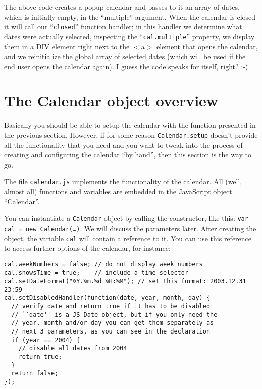 \documentclass[a4paper,twoside,10pt]{dynadoc}
\begin{document}
The above code creates a popup calendar and passes to it an array of dates,
which is initially empty, in the “multiple” argument.  When the calendar is
closed it will call our “\texttt{closed}” function handler; in this handler
we determine what dates were actually selected, inspecting the
“\texttt{cal.multiple}” property, we display them in a DIV element right
next to the $<$a$>$ element that opens the calendar, and we reinitialize the
global array of selected dates (which will be used if the end user opens the
calendar again).  I guess the code speaks for itself, right? :-)




\section{The Calendar object overview}\label{sec:Calendar_overview}

Basically you should be able to setup the calendar with the function presented
in the previous section.  However, if for some reason \texttt{Calendar.setup}
doesn't provide all the functionality that you need and you want to tweak into
the process of creating and configuring the calendar ``by hand'', then this
section is the way to go.

The file \texttt{calendar.js} implements the functionality of the calendar.
All (well, almost all) functions and variables are embedded in the JavaScript
object ``Calendar''.

You can instantiate a \texttt{Calendar} object by calling the constructor, like
this: \texttt{var cal = new Calendar(\ldots)}.  We will discuss the parameters
later.  After creating the object, the variable \texttt{cal} will contain a
reference to it.  You can use this reference to access further options of the
calendar, for instance:

\begin{verbatim}
cal.weekNumbers = false; // do not display week numbers
cal.showsTime = true;    // include a time selector
cal.setDateFormat("%Y.%m.%d %H:%M"); // set this format: 2003.12.31 23:59
cal.setDisabledHandler(function(date, year, month, day) {
  // verify date and return true if it has to be disabled
  // ``date'' is a JS Date object, but if you only need the
  // year, month and/or day you can get them separately as
  // next 3 parameters, as you can see in the declaration
  if (year == 2004) {
    // disable all dates from 2004
    return true;
  }
  return false;
});
\end{verbatim}
\end{document}
